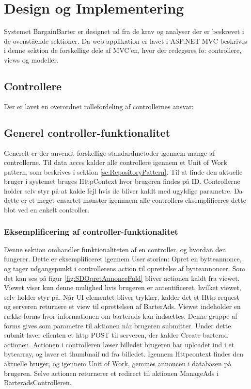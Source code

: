 
\chapter{Design og Implementering}\label{ch:Design}
Systemet BargainBarter er designet ud fra de krav og analyser der er beskrevet i de ovenstående sektioner. Da web applikation er lavet i ASP.NET MVC beskrives i denne sektion de forskellige dele af MVC'en, hvor der redegøres fo: controllere, views og modeller. 


\section{Controllere}
Der er lavet en overordnet rollefordeling af controllernes ansvar: 




\section{Generel controller-funktionalitet}\label{sc:GenerelControl}


Generelt er der anvendt forskellige standardmetoder igennem mange af controllerne. Til data acces kalder alle controllere igennem et Unit of Work pattern, som beskrives i sektion \ref{sc:RepositoryPattern}. Til at finde den aktuelle bruger i systemet bruges HttpContext hvor brugeren findes på ID. Controllerne holder selv styr på at kalde fejl hvis de bliver kaldt med ugyldige parametre. Da dette er et meget ensartet mønster igennnem alle controllers eksemplificeres dette blot ved en enkelt controller.

\subsection{Eksemplificering af controller-funktionalitet}
Denne sektion omhandler funktionaliteten af en controller, og hvordan den fungerer. Dette er eksemplificeret igennem User storien: Opret en bytteannonce, og tager udgangspunkt i controllerens action til oprettelse af bytteannoncer.
Som det kan ses på figur \ref{fig:SDOpretAnnonceFuld} bliver actionen kaldt fra viewet. Viewet viser kun denne mulighed hvis brugeren er autentificeret, hvilket viewet, selv holder styr på. Når UI elementet bliver trykker, kalder det et Http request og serveren returnere et view til oprettelsen af BarterAds. Viewet indeholder en række forms hvor informationen om barterads kan indsættes. Denne gruppe af forms gives som parametre til aktionen når brugeren submitter. Under dette submit laver clienten et http POST til serveren, der kalder Create barterad actionen. Actionen i controlleren læser billedet brugeren har uploadet ind i et bytearray, og laver et thumbnail ud fra billedet. Igennem Httpcontext findes den aktuelle bruger, og igennem Unit of Work, gemmes annoncen i databasen på brugeren. Selve actionen returnerer et redirect til aktionen ManageAds i BarteradsControlleren. 

